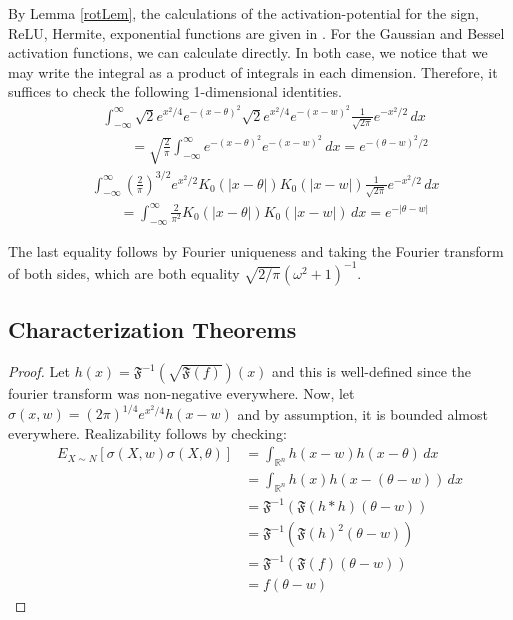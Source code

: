 \documentclass{article}
\newcommand{\R}{{\mathbb{R}}}
\begin{document}
By Lemma \ref{rotLem}, the calculations of the activation-potential
for the sign, ReLU, Hermite, exponential functions are given in
\cite{DanielyFS16}. For the Gaussian and Bessel activation functions,
we can calculate directly. In both case, we notice that we may write
the integral as a product of integrals in each dimension. Therefore,
it suffices to check the following 1-dimensional identities.
\begin{align*}
  & \int_{-\infty}^\infty
    \sqrt{2}e^{x^2/4}e^{-(x-\theta)^2}\sqrt{2}e^{x^2/4}e^{-(x-w)^2} \frac{1}{\sqrt{2\pi}} e^{-x^2/2}\, dx \\
  & \qquad = \sqrt{\frac{2}{\pi}}\int_{-\infty}^\infty
    e^{-(x-\theta)^2}e^{-(x-w)^2} \, dx = e^{-(\theta -w)^2/2}
\end{align*}
\begin{align*}
& \int_{-\infty}^\infty (\frac{2}{\pi})^{3/2}e^{x^2/2}K_0(|x-\theta|)K_0(|x-w|)  \frac{1}{\sqrt{2\pi}} e^{-x^2/2}\, dx \\
& \qquad 
= \int_{-\infty}^\infty \frac{2}{\pi^2}K_0(|x-\theta|)K_0(|x-w|) \, dx
  = e^{-|\theta -w|}
\end{align*}


The last equality follows by Fourier uniqueness and taking the Fourier transform of both sides, which are both equality $\sqrt{2/\pi}(\omega^2+1)^{-1}$. 


\subsection{Characterization Theorems}

\tranReal*

\begin{proof}
Let $h(x) = \mathfrak{F}^{-1}(\sqrt{\mathfrak{F}(f)})(x)$ and this is well-defined since the fourier transform was non-negative everywhere. Now, let $\sigma(x,w) = (2\pi)^{1/4}e^{x^2/4}h(x-w)$ and by assumption, it is bounded almost everywhere. Realizability follows by checking:
%
\begin{align*}
    E_{X \sim N}[\sigma(X,w)\sigma(X,\theta)]  &= \int_{\R^n} h(x-w)h(x-\theta) \, dx \\
    &= \int_{\R^n} h(x)h(x-(\theta-w)) \, dx \\
    &= \mathfrak{F}^{-1}(\mathfrak{F}(h\ast h)(\theta -w)) \\
    &= \mathfrak{F}^{-1}(\mathfrak{F}(h)^2(\theta - w)) \\
    &= \mathfrak{F}^{-1}(\mathfrak{F}(f)(\theta - w)) \\
    &= f(\theta - w) 
\end{align*}
\end{proof}
\end{document}
